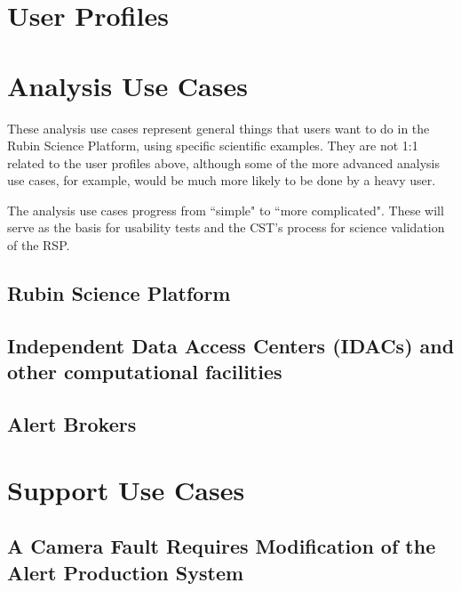 \documentclass[DM,lsstdraft,authoryear,toc]{lsstdoc}
\begin{document}
\clearpage
\section{User Profiles}




\clearpage
\section{Analysis Use Cases}

These analysis use cases represent general things that users want to do in the Rubin Science Platform,
using specific scientific examples.
They are not 1:1 related to the user profiles above, although some of the more advanced analysis
use cases, for example, would be much more likely to be done by a heavy user.

The analysis use cases progress from ``simple" to ``more complicated".
These will serve as the basis for usability tests and the CST's process for science validation of
the RSP.

\subsection{Rubin Science Platform}



\subsection{Independent Data Access Centers (IDACs) and other computational facilities}



\subsection{Alert Brokers}



\clearpage
\section{Support Use Cases}

\clearpage


\clearpage


\clearpage


\clearpage
\subsection{A Camera Fault Requires Modification of the Alert Production System}

\end{document}
